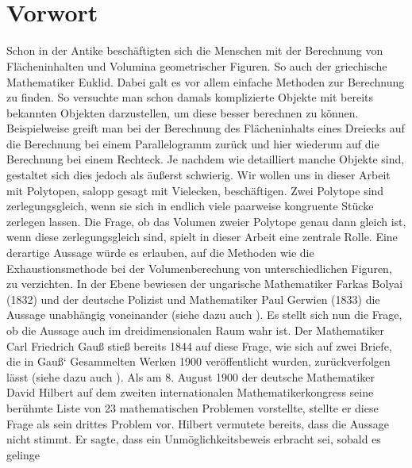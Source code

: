 \documentclass[11pt,titlepage]{article}
\theoremstyle{definition}
\theoremstyle{remark}
\begin{document}
	\newpage \ 
	\thispagestyle{empty}
	\newpage
	\thispagestyle{empty}
	
	\tableofcontents
	
	
	\newpage \
	\thispagestyle{empty} 
	\newpage
	\setcounter{page}{1}
	
	\section*{Vorwort}
	
	Schon in der Antike beschäftigten sich die Menschen mit der Berechnung 
	von Flächeninhalten und Volumina geometrischer Figuren. So auch 
	der griechische Mathematiker Euklid. Dabei galt es vor allem 
	einfache Methoden zur Berechnung zu finden. So versuchte man schon 
	damals komplizierte 
	Objekte mit bereits bekannten Objekten darzustellen, um diese besser 
	berechnen zu können. 
	Beispielweise greift man bei der Berechnung des Flächeninhalts eines 
	Dreiecks auf die Berechnung bei einem Parallelogramm zurück und hier 
	wiederum auf die Berechnung bei einem Rechteck. Je nachdem wie 
	detailliert manche Objekte sind, gestaltet sich dies jedoch als äußerst 
	schwierig. Wir wollen uns in dieser Arbeit mit Polytopen, 
	salopp gesagt mit Vielecken, beschäftigen. Zwei Polytope sind 
	zerlegungsgleich, wenn sie sich in endlich viele paarweise kongruente 
	Stücke zerlegen lassen. Die Frage, ob das Volumen zweier Polytope genau 
	dann gleich ist, wenn diese zerlegungsgleich sind, spielt in dieser 
	Arbeit eine zentrale Rolle. Eine derartige Aussage würde es erlauben, 
	auf die Methoden wie die Exhaustionsmethode bei der Volumenberechung von 
	unterschiedlichen Figuren, zu verzichten. In der Ebene 
	bewiesen der ungarische Mathematiker Farkas Bolyai (1832) und 
	der deutsche Polizist und Mathematiker Paul Gerwien (1833) 
	die Aussage unabhängig voneinander (siehe dazu auch \cite{Boltianskii}). 
	Es stellt sich nun die Frage, ob die Aussage auch im dreidimensionalen 
	Raum wahr ist. Der Mathematiker Carl Friedrich Gauß stieß bereits 1844 
	auf diese Frage, wie sich auf zwei Briefe, die in Gauß` Gesammelten Werken 
	1900 veröffentlicht wurden, zurückverfolgen lässt (siehe dazu 
	auch \cite{Proofsfromthebook}). Als am 8. August 1900 der deutsche 
	Mathematiker David Hilbert auf dem zweiten internationalen Mathematikerkongress 
	seine berühmte Liste von 23 mathematischen Problemen vorstellte, stellte 
	er diese Frage als sein drittes Problem vor. Hilbert vermutete bereits, 
	dass die Aussage nicht stimmt. Er sagte, dass ein Unmöglichkeitsbeweis 
	erbracht sei, sobald es gelinge
\end{document}
